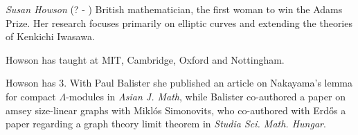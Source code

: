 \documentclass[12pt]{article}
\begin{document}
\emph{Susan Howson} (? - ) British mathematician, the first woman to win the Adams Prize. Her research focuses primarily on elliptic curves and extending the theories of Kenkichi Iwasawa.

Howson has taught at MIT, Cambridge, Oxford and Nottingham.

Howson has  3. With Paul Balister she published an article on Nakayama's lemma for compact $\Lambda$-modules in {\it Asian J. Math}, while Balister co-authored a paper on amsey size-linear graphs with Mikl\'os Simonovits, who co-authored with Erd\H{o}s a paper regarding a graph theory limit theorem in {\it Studia Sci. Math. Hungar}.
\end{document}
